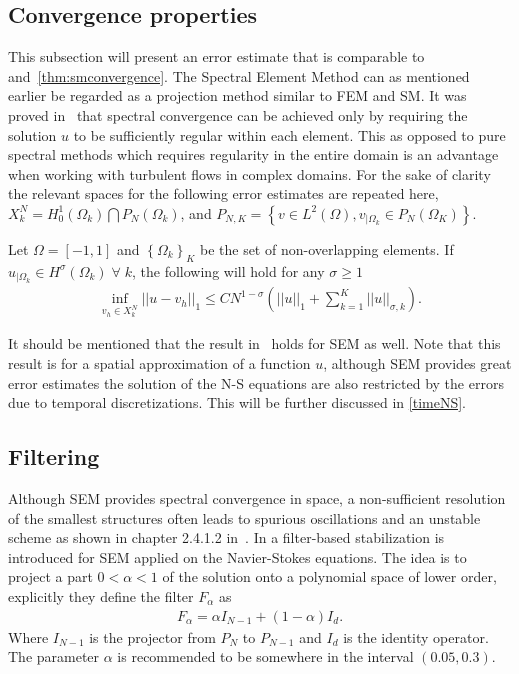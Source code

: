 
\subsection{Convergence properties}
This subsection will present an error estimate that is comparable
to  and~\ref{thm:smconvergence}.
The Spectral Element Method can as mentioned earlier be regarded as a projection 
method similar to FEM and SM. 
It was proved in~\cite{MPR1987} that spectral convergence can be achieved only by requiring the solution
$u$ to be sufficiently regular within each element. This as opposed to pure spectral methods which
requires regularity in the entire domain is an advantage when working with turbulent flows 
in complex domains.
For the sake of clarity the relevant spaces for the following error estimates are 
repeated here, $X^N_k =  H_0^1(\Omega_k)\bigcap P_N(\Omega_k)$, and 
$P_{N,K} = \left\{ v \in L^2(\Omega),v_{|\Omega_k} \in P_N(\Omega_K) \right\}$.
\begin{theorem}
    Let $\Omega = [-1,1]$ and $\left\{ \Omega_k \right\}_K$ be the set of non-overlapping elements. 
    If $u_{|\Omega_k} \in H^{\sigma}(\Omega_k)\; \forall \; k $, the following will hold for 
    any $\sigma \ge 1$
\begin{align}
    \inf_{v_{h}\in X_{k}^N}||u-v_h||_1 \le CN^{1-\sigma}\left( ||u||_1 + \sum_{k=1}^{K}||u||_{\sigma,k} \right).
\end{align}

    \label{thm:semconvergence}
\end{theorem}
%
It should be mentioned that the result in~ holds for SEM as well.
Note that this result is for a spatial approximation of a function $u$, although SEM provides 
great error estimates the solution of the N-S equations are also restricted by the errors due to 
temporal discretizations. This will be further discussed in \cref{timeNS}.
\subsection{Filtering} \label{filtering}
Although SEM provides spectral convergence in space,
a non-sufficient resolution of the smallest structures
often leads to spurious oscillations and an unstable scheme 
as shown in chapter 2.4.1.2 in~\cite{Karniadakis}. In \cite{FischerMullen} a filter-based 
stabilization is introduced for SEM applied on 
the Navier-Stokes equations. The idea is to project a part $ 0 <\alpha < 1$ 
of the solution onto a polynomial space of lower order, 
explicitly they define the filter $F_{\alpha}$ as 
%
\begin{align}
    F_{\alpha}= \alpha I_{N-1}  + (1-\alpha) I_d.
    \label{eq:filter}
\end{align}
%
Where $I_{N-1}$ is the projector from $P_N$ to $P_{N-1}$ and $ I_d$ is the identity operator.
The parameter $\alpha$ is recommended to be somewhere in the interval $(0.05,0.3)$.

